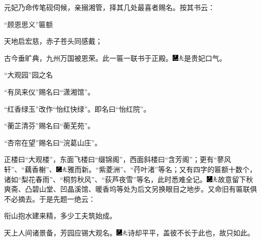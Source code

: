 元妃乃命传笔砚伺候，亲搦湘管，择其几处最喜者赐名。按其书云：

``顾恩思义''{匾额}

天地启宏慈，赤子苍头同感戴；

古今垂旷典，九州万国被恩荣。{此一匾一联书于正殿。{\includegraphics[width=3mm]{../Images/00003}\includegraphics[width=3mm]{../Images/00012}\footnotesize \kaishu 是贵妃口气。}}

``大观园''{园之名}

``有凤来仪''{赐名曰``潇湘馆''。}

``红香绿玉''改作``怡红快绿''。{即名曰``怡红院''。}

``蘅芷清芬''{赐名曰``蘅芜苑''。}

``杏帘在望''{赐名曰``浣葛山庄''。}

正楼曰``大观楼''，东面飞楼曰``缀锦阁''，西面斜楼曰``含芳阁''；更有``蓼风轩''、``藕香榭''、{\includegraphics[width=3mm]{../Images/00003}\includegraphics[width=3mm]{../Images/00012}\footnotesize \kaishu 雅而新。}``紫菱洲''、``荇叶渚''等名；又有四字的匾额十数个，诸如``梨花春雨''、``桐剪秋风''、``荻芦夜雪''等名，此时悉难全记。{\includegraphics[width=3mm]{../Images/00003}\includegraphics[width=3mm]{../Images/00012}\footnotesize \kaishu 故意留下秋爽斋、凸碧山堂、凹晶溪馆、暖香坞等处为后文另换眼目之地步。}又命旧有匾联俱不必摘去。于是先题一绝云：

衔山抱水建来精，多少工夫筑始成。

天上人间诸景备，芳园应锡大观名。{\includegraphics[width=3mm]{../Images/00003}\includegraphics[width=3mm]{../Images/00012}\footnotesize \kaishu 诗却平平，盖彼不长于此也，故只如此。}

